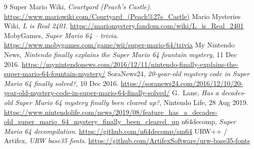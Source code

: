\documentclass[10pt,a4paper]{article}
\begin{document}
\begin{thebibliography}{9}\small
{} Super Mario Wiki, \emph{Courtyard (Peach's Castle)}. \url{https://www.mariowiki.com/Courtyard_(Peach\%27s_Castle)}
 Mario Mysteries Wiki, \emph{L is Real 2401}. \url{https://mariomystery.fandom.com/wiki/L_is_Real_2401}
 MobyGames, \emph{Super Mario 64 -- trivia}. \url{https://www.mobygames.com/game/wii/super-mario-64/trivia}
 My Nintendo News, \emph{Nintendo finally explains the Super Mario 64 fountain mystery}, 11 Dec 2016. \url{https://mynintendonews.com/2016/12/11/nintendo-finally-explains-the-super-mario-64-fountain-mystery/}
 SoraNews24, \emph{20-year-old mystery code in Super Mario 64 finally solved?}, 10 Dec 2016. \url{https://soranews24.com/2016/12/10/20-year-old-mystery-code-in-super-mario-64-finally-solved/}
 G.~Lane, \emph{Has a decades-old Super Mario 64 mystery finally been cleared up?}, Nintendo Life, 28 Aug 2019. \url{https://www.nintendolife.com/news/2019/08/feature_has_a_decades-old_super_mario_64_mystery_finally_been_cleared_up}
 n64decomp, \emph{Super Mario 64 decompilation}. \url{https://github.com/n64decomp/sm64}
 URW++ / Artifex, \emph{URW base35 fonts}. \url{https://github.com/ArtifexSoftware/urw-base35-fonts}
\end{thebibliography}
\end{document}
